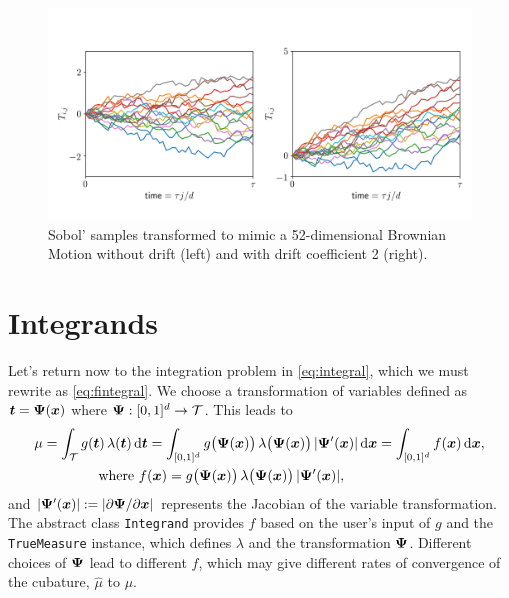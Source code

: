 \documentclass[graybox,footinfo]{svmult}
\newcommand{\QMCPYabs}[1]{\ensuremath{{\left \lvert #1 \right \rvert}}}
\newcommand{\hmu}{\widehat{\mu}}
\newcommand{\cube}{[0,1]^d}
\begin{document}
\begin{figure}
	\includegraphics[width=1\textwidth]{QMCSoftwareArticle/figs/tm_bm.png} 
	\caption{Sobol' samples transformed to mimic a 52-dimensional Brownian Motion without drift (left) and with drift coefficient 2 (right).}
	\label{fig:tm_bm}
\end{figure}

\section{Integrands}

Let's return now to the integration problem in \eqref{eq:integral}, which we must rewrite as \eqref{eq:fintegral}.  We choose a transformation of variables defined as ${\boldsymbol{t}} = {\boldsymbol{\Psi}}({\boldsymbol{x}})$ where $\bsPsi:\cube \to \calT$.  This leads to 
\begin{align}
	\nonumber 
 \mu &= \int_\calT g(\bst) \, \lambda(\bst) \, \D \bst  = \int_{\cube} g\bigl(\bsPsi(\bsx)\bigr) \, \lambda\bigl(\bsPsi(\bsx)\bigr) \,\QMCPYabs{\bsPsi'(\bsx)}  \, \D \bsx =  \int_{\cube}f(\bsx) \, \D \bsx,  \\
 \label{eq:transVar}
  & \qquad \qquad \text{where } f(\bsx)  = g\bigl(\bsPsi(\bsx)\bigr)  \, \lambda\bigl(\bsPsi(\bsx)\bigr) \,\QMCPYabs{\bsPsi'(\bsx)} ,
\end{align}
and $\QMCPYabs{\bsPsi'(\bsx)} := \QMCPYabs{\partial \bsPsi/\partial \bsx}$ represents the Jacobian of the variable transformation.  The abstract class \texttt{Integrand} provides $f$ based on the user's input of $g$ and the \texttt{TrueMeasure} instance, which defines $\lambda$ and the transformation ${\boldsymbol{\Psi}}$. Different choices of ${\boldsymbol{\Psi}}$ lead to different $f$, which may give different rates of convergence of the cubature, $\hmu$ to $\mu$.
\end{document}
